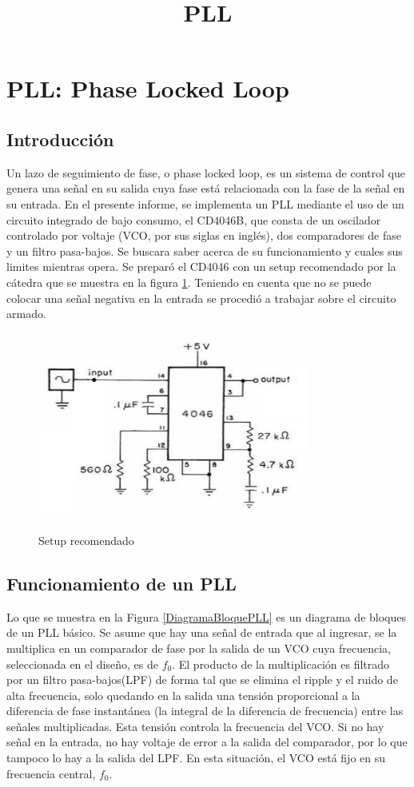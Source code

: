 \documentclass[10pt,a4paper]{article}
\title{PLL}
\begin{document}
\section{PLL: Phase Locked Loop}

\subsection{Introducción}

Un lazo de seguimiento de fase, o phase locked loop, es un sistema de control que genera una señal en su salida cuya fase está relacionada con la fase de la señal en su entrada. En el presente informe, se implementa un PLL mediante el uso de un circuito integrado de bajo consumo, el CD4046B, que consta de un oscilador controlado por voltaje (VCO, por sus siglas en inglés), dos comparadores de fase y un filtro pasa-bajos. Se buscara saber acerca de su funcionamiento y cuales sus limites mientras opera. 
Se preparó el CD4046 con un setup recomendado por la cátedra que se muestra en la figura \ref{fig:Circuito PLL}. Teniendo en cuenta que no se puede colocar una señal negativa en la entrada se procedió a trabajar sobre el circuito armado.

\begin{figure}[H]
	\centering
	\includegraphics[width= 0.8\textwidth]{../1. PLL/Imagenes/Circuito PLL.png} 
	\label{fig:Circuito PLL}
	\caption{Setup recomendado}
\end{figure}

\subsection{Funcionamiento de un PLL}

Lo que se muestra en la Figura \ref{DiagramaBloquePLL} es un diagrama de bloques de un PLL básico. Se asume que hay una señal de entrada que al ingresar, se la multiplica en un comparador de fase por la salida de un VCO cuya frecuencia, seleccionada en el diseño, es de $f_0$. El producto de la multiplicación es filtrado por un filtro pasa-bajos(LPF) de forma tal que se elimina el ripple y el ruido de alta frecuencia, solo quedando en la salida una tensión proporcional a la diferencia de fase instantánea (la integral de la diferencia de frecuencia) entre las señales multiplicadas. Esta tensión controla la frecuencia del VCO. Si no hay señal en la entrada, no hay voltaje de error a la salida del comparador, por lo que tampoco lo hay a la salida del LPF. En esta situación, el VCO está fijo en su frecuencia central, $f_0$.
\end{document}
